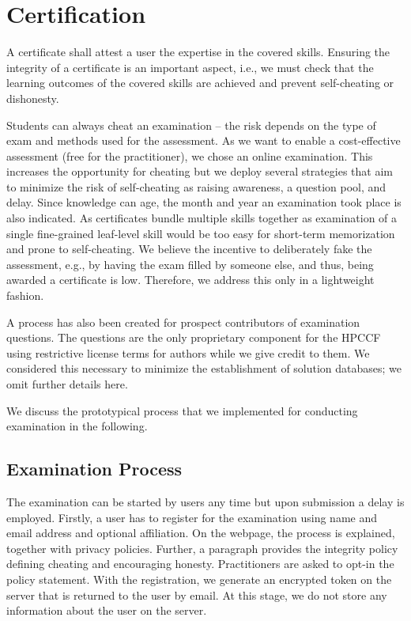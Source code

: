 \documentclass[jocse]{jocseart}
\begin{document}
\section{Certification}
\label{sec:certification}

A certificate shall attest a user the expertise in the covered skills.
Ensuring the integrity of a certificate is an important aspect, i.e., we must check that the learning outcomes of the covered skills are achieved and prevent self-cheating or dishonesty.

Students can always cheat an examination -- the risk depends on the type of exam and methods used for the assessment.
As we want to enable a cost-effective assessment (free for the practitioner), we chose an online examination.
This increases the opportunity for cheating \cite{rowe2004cheating} but we deploy several  strategies that aim to minimize the risk of self-cheating as raising awareness, a question pool, and delay.
Since knowledge can age, the month and year an examination took place is also indicated.
As certificates bundle multiple skills together as examination of a single fine-grained leaf-level skill would be too easy for short-term memorization and prone to self-cheating.
We believe the incentive to deliberately fake the assessment, e.g., by having the exam filled by someone else, and thus, being awarded a certificate is low.
Therefore, we address this only in a lightweight fashion.

A process has also been created for prospect contributors of examination questions.
The questions are the only proprietary component for the HPCCF using restrictive license terms for authors while we give credit to them.
We considered this necessary to minimize the establishment of solution databases; we omit further details here.

We discuss the prototypical process that we implemented for conducting examination in the following.

\subsection{Examination Process}

The examination can be started by users any time but upon submission a delay is employed.
Firstly, a user has to register for the examination using name and email address and optional affiliation.
On the webpage, the process is explained, together with privacy policies.
Further, a paragraph provides the integrity policy defining cheating and encouraging honesty.
Practitioners are asked to opt-in the policy statement.
With the registration, we generate an encrypted token on the server that is returned to the user by email.
At this stage, we do not store any information about the user on the server.
\end{document}
